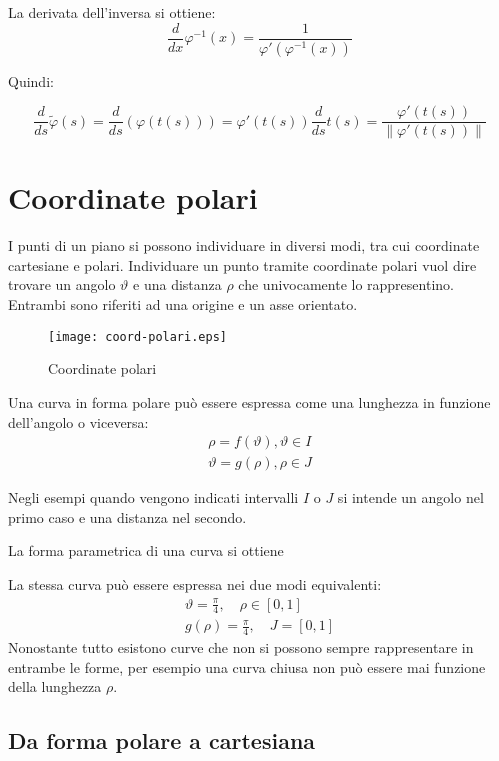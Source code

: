La derivata dell'inversa si ottiene:
\begin{equation}
	\frac{d}{dx}\varphi^{-1}(x)=\frac{1}{\varphi'(\varphi^{-1}(x))}
\end{equation}

Quindi:

\begin{equation}
	\frac{d}{ds} \tilde{\varphi}(s)=\frac{d}{ds}(\varphi(t(s)))=\varphi'(t(s)) \frac{d}{ds}t(s)=\frac{\varphi'(t(s))}{\left\|\varphi'(t(s))\right\|}
\end{equation}

\section{Coordinate polari}
I punti di un piano si possono individuare in diversi modi, tra cui coordinate cartesiane e polari. Individuare un punto tramite coordinate polari vuol dire trovare un angolo $\vartheta$ e una distanza $\rho$ che univocamente lo rappresentino. Entrambi sono riferiti ad una origine e un asse orientato.
\begin{figure}
	\texttt{[image: coord-polari.eps]}
	\centering
	\caption{Coordinate polari}
\end{figure}

Una curva in forma polare può essere espressa come una lunghezza in funzione dell'angolo o viceversa:
\begin{gather}
	\rho=f(\vartheta), \vartheta\in I \\
	\vartheta=g(\rho), \rho\in J
\end{gather}

Negli esempi quando vengono indicati intervalli $I$ o $J$ si intende un angolo nel primo caso e una distanza nel secondo.

La forma parametrica di una curva si ottiene 

\begin{example}
La stessa curva può essere espressa nei due modi equivalenti:
\begin{gather*}
	\vartheta=\frac{\pi}{4}, \quad \rho\in [0, 1] \\
	g(\rho)=\frac{\pi}{4}, \quad J=[0, 1]
\end{gather*}
Nonostante tutto esistono curve che non si possono sempre rappresentare in entrambe le forme, per esempio una curva chiusa non può essere mai funzione della lunghezza $\rho$.
\end{example}

\subsection{Da forma polare a cartesiana}

